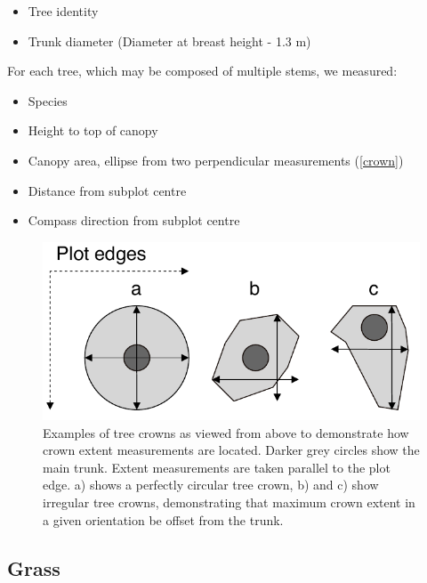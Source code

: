 \documentclass[11pt,a4paper]{article}
\begin{document}
\begin{itemize}
	\item{Tree identity}
	\item{Trunk diameter (Diameter at breast height - 1.3 m)}
\end{itemize}

For each tree, which may be composed of multiple stems, we measured: 

\begin{itemize}
	\item{Species}
	\item{Height to top of canopy}
	\item{Canopy area, ellipse from two perpendicular measurements (\autoref{crown})}
	\item{Distance from subplot centre}
	\item{Compass direction from subplot centre}
\end{itemize}

\begin{figure}[H]
\centering
	\includegraphics[width=\textwidth]{crown}
	\caption{Examples of tree crowns as viewed from above to demonstrate how crown extent measurements are located. Darker grey circles show the main trunk. Extent measurements are taken parallel to the plot edge. a) shows a perfectly circular tree crown, b) and c) show irregular tree crowns, demonstrating that maximum crown extent in a given orientation be offset from the trunk.}
	\label{crown}
\end{figure}

\subsection{Grass} 
\end{document}
